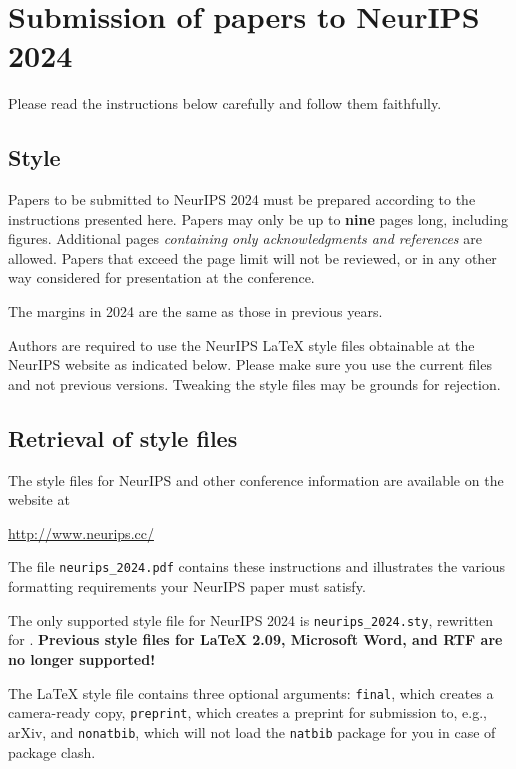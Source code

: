 \documentclass{article}
\begin{document}
	\section{Submission of papers to NeurIPS 2024}
	
	
	Please read the instructions below carefully and follow them faithfully.
	
	
	\subsection{Style}
	
	
	Papers to be submitted to NeurIPS 2024 must be prepared according to the
	instructions presented here. Papers may only be up to {\bf nine} pages long,
	including figures. Additional pages \emph{containing only acknowledgments and
		references} are allowed. Papers that exceed the page limit will not be
	reviewed, or in any other way considered for presentation at the conference.
	
	
	The margins in 2024 are the same as those in previous years.
	
	
	Authors are required to use the NeurIPS \LaTeX{} style files obtainable at the
	NeurIPS website as indicated below. Please make sure you use the current files
	and not previous versions. Tweaking the style files may be grounds for
	rejection.
	
	
	\subsection{Retrieval of style files}
	
	
	The style files for NeurIPS and other conference information are available on
	the website at
	\begin{center}
		\url{http://www.neurips.cc/}
	\end{center}
	The file \verb+neurips_2024.pdf+ contains these instructions and illustrates the
	various formatting requirements your NeurIPS paper must satisfy.
	
	
	The only supported style file for NeurIPS 2024 is \verb+neurips_2024.sty+,
	rewritten for \LaTeXe{}.  \textbf{Previous style files for \LaTeX{} 2.09,
		Microsoft Word, and RTF are no longer supported!}
	
	
	The \LaTeX{} style file contains three optional arguments: \verb+final+, which
	creates a camera-ready copy, \verb+preprint+, which creates a preprint for
	submission to, e.g., arXiv, and \verb+nonatbib+, which will not load the
	\verb+natbib+ package for you in case of package clash.
	
\end{document}
